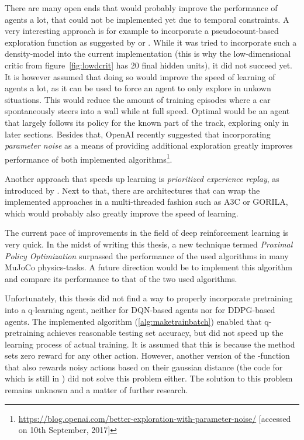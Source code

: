 There are many open ends that would probably improve the performance of agents a lot, that could not be implemented yet due to temporal constraints. A very interesting approach is for example to incorporate a pseudocount-based exploration function as suggested by \cite{ostrovski_count-based_2017} or \cite{martin_count-based_2017}. While it was tried to incorporate such a density-model into the current implementation (this is why the low-dimensional critic from figure~\ref{fig:lowdcrit} has 20 final hidden units), it did not succeed yet. It is however assumed that doing so would improve the speed of learning of agents a lot, as it can be used to force an agent to only explore in unkown situations. This would reduce the amount of training episodes where a car spontaneously steers into a wall while at full speed. Optimal would be an agent that largely follows its policy for the known part of the track, exploring only in later sections. Besides that, OpenAI recently suggested that incorporating \textit{parameter noise} as a means of providing additional exploration greatly improves performance of both implemented algorithms\footnote{\url{https://blog.openai.com/better-exploration-with-parameter-noise/} [accessed on 10th September, 2017]}.

Another approach that speeds up learning is \textit{prioritized experience replay}, as introduced by \cite{schaul_prioritized_2015}. Next to that, there are architectures that can wrap the implemented approaches in a multi-threaded fashion such as  A3C\cite{mnih_asynchronous_2016} or GORILA\cite{nair_massively_2015}, which would probably also greatly improve the speed of learning.

The current pace of improvements in the field of deep reinforcement learning is very quick. In the midst of writing this thesis, a new technique termed \textit{Proximal Policy Optimization} \cite{schulman_proximal_2017} surpassed the performance of the used algorithms in many MuJoCo physics-tasks. A future direction would be to implement this algorithm and compare its performance to that of the two used algorithms.

Unfortunately, this thesis did not find a way to properly incorporate pretraining into a q-learning agent, neither for DQN-based agents nor for DDPG-based agents. The implemented algorithm (\ref{alg:maketrainbatch}) enabled that q-pretraining achieves reasonable testing set accuracy, but did not speed up the learning process of actual training. It is assumed that this is because the method sets zero reward for any other action. However, another version of the -function that also rewards noisy actions based on their gaussian distance (the code for which is still in ) did not solve this problem either. The solution to this problem remains unknown and a matter of further research.

